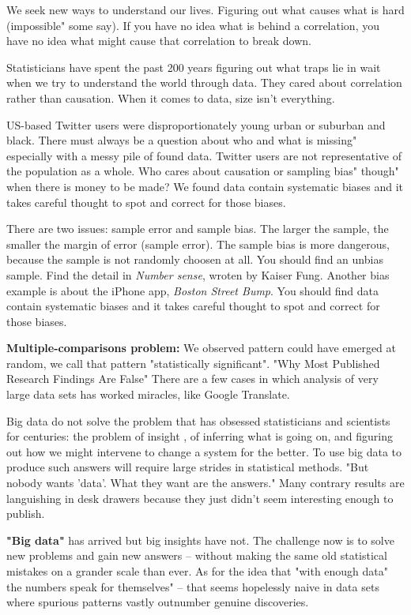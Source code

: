 We seek new ways to understand our lives.
Figuring out what causes what is hard (impossible" some say).
If you have no idea what is behind a correlation, you have no idea what might cause that correlation to break down. 

Statisticians have spent the past 200 years figuring out what traps lie in wait when we try to understand the world through data. 
They cared  about correlation rather than causation.
When it comes to data, size isn't everything.

US-based Twitter users were disproportionately young  urban or suburban and black.
There must always be a question about who and what is missing" especially with a messy pile of found data.
Twitter users are not representative of the population as a whole.
Who cares about causation or sampling bias" though" when there is money to be made?
We found data contain systematic biases and it takes careful thought to spot and correct for those biases. 

There are two issues: sample error and sample bias. The larger the sample, the smaller the margin of error (sample error). 
The sample bias is more dangerous, because the sample is not randomly 
choosen at all. 
You should find an unbias sample. Find the detail in {\it Number sense}, wroten by Kaiser Fung.
Another bias example is about the iPhone app, {\it Boston Street Bump}.
You should find data contain systematic biases and it takes careful thought to
spot and correct for those biases.

{\bf Multiple-comparisons problem: }
We observed pattern could have emerged at random, we call that pattern "statistically significant".
"Why Most Published Research Findings Are False"
There are a few cases in which analysis of very large data sets has worked miracles, like
Google Translate.

Big data do not solve the problem that has obsessed statisticians and scientists for centuries: the problem of insight , of inferring what is going on, and figuring out how we might intervene to change a system for the better.  To use big data to produce such answers will require large strides in statistical methods.
"But nobody wants 'data'. What they want are the answers."
Many contrary results are languishing in desk drawers because they just didn't seem interesting enough to publish. 

{\bf{"Big data"}} has arrived but big insights have not. The challenge now is to solve new problems and gain new answers -- without making the same old statistical mistakes on a grander scale than ever.
As for the idea that "with enough data" the numbers speak for themselves" -- that seems hopelessly naive in data sets where spurious patterns vastly outnumber genuine discoveries.

